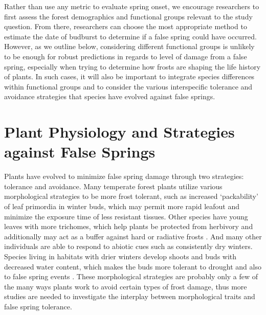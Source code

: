 \documentclass{article}\usepackage[]{graphicx}\usepackage[]{color}
\begin{document}
Rather than use any metric to evaluate spring onset, we encourage researchers to first assess the forest demographics and functional groups relevant to the study question. From there, researchers can choose the most appropriate method to estimate the date of budburst to determine if a false spring could have occurred. However, as we outline below, considering different functional groups is unlikely to be enough for robust predictions in regards to level of damage from a false spring, especially when trying to determine how frosts are shaping the life history of plants. In such cases, it will also be important to integrate species differences within functional groups and to consider the various interspecific tolerance and avoidance strategies that species have evolved against false springs. 


\section* {Plant Physiology and Strategies against False Springs}
Plants have evolved to minimize false spring damage through two strategies: tolerance and avoidance. Many temperate forest plants utilize various morphological strategies to be more frost tolerant, such as increased `packability' of leaf primordia in winter buds, which may permit more rapid leafout \citep{Edwards2017} and minimize the exposure time of less resistant tissues. Other species have young leaves with more trichomes, which help plants be protected from herbivory and additionally may act as a buffer against hard or radiative frosts \citep{Agrawal2004, Prozherina2003}. And many other individuals are able to respond to abiotic cues such as consistently dry winters. Species living in habitats with drier winters develop shoots and buds with decreased water content, which makes the buds more tolerant to drought and also to false spring events \citep{Beck2007, Kathke2011, Hofmann2015, Morin2007,  Muffler2016, Nielsen2009, Poirier2010}. These morphological strategies are probably only a few of the many ways plants work to avoid certain types of frost damage, thus more studies are needed to investigate the interplay between morphological traits and false spring tolerance. 
\end{document}
